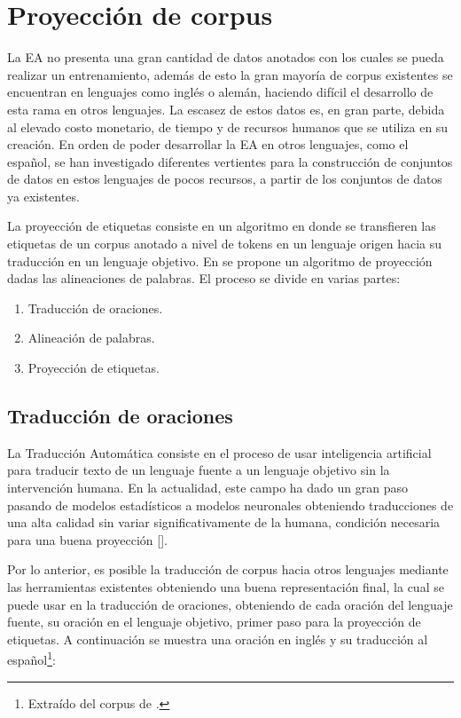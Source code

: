 \section{Proyección de corpus}

La EA no presenta una gran cantidad de datos anotados con los cuales se pueda realizar 
un entrenamiento, además de esto la gran mayoría de corpus existentes se encuentran en lenguajes como inglés o alemán,
haciendo difícil el desarrollo de esta rama en otros lenguajes.
La escasez de estos datos es, en gran parte, debida al elevado costo monetario, de tiempo y de recursos humanos que se utiliza
en su creación. En orden de poder desarrollar la EA en otros lenguajes, como el español, se han investigado diferentes vertientes
para la construcción de conjuntos de datos en estos lenguajes de pocos recursos, a partir de los conjuntos de datos ya 
existentes.

La proyección de etiquetas consiste en un algoritmo en donde se 
transfieren las etiquetas de un corpus anotado a nivel de tokens en un lenguaje origen hacia su traducción en un
lenguaje objetivo. En \textcite{eger2018cross} se propone un algoritmo de proyección dadas las alineaciones de 
palabras. El proceso se divide en varias partes:

\begin{enumerate}
	\item Traducción de oraciones.
	\item Alineación de palabras.
	\item Proyección de etiquetas.
\end{enumerate}

\subsection{Traducción de oraciones}

La Traducción Automática consiste en el proceso de usar inteligencia artificial para
traducir texto de un lenguaje fuente a un lenguaje objetivo sin la intervención humana.
En la actualidad, este campo ha dado un gran paso pasando de modelos estadísticos a modelos
neuronales obteniendo traducciones de una alta calidad sin variar significativamente de la humana, 
condición necesaria para una buena proyección [\cite{eger2018cross}].

Por lo anterior, es posible la traducción de corpus hacia otros lenguajes mediante las
herramientas existentes obteniendo una buena representación final, la cual se puede usar en la traducción de
oraciones, obteniendo de cada oración del lenguaje fuente, su oración en el 
lenguaje objetivo, primer paso para la proyección de etiquetas. 
A continuación se muestra una oración en inglés y su traducción al español\footnote{Extraído del corpus de \textcite{stab2017parsing}.}:

